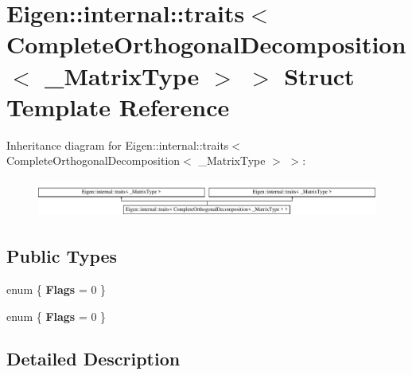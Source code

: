 \hypertarget{struct_eigen_1_1internal_1_1traits_3_01_complete_orthogonal_decomposition_3_01___matrix_type_01_4_01_4}{}\section{Eigen\+:\+:internal\+:\+:traits$<$ Complete\+Orthogonal\+Decomposition$<$ \+\_\+\+Matrix\+Type $>$ $>$ Struct Template Reference}
\label{struct_eigen_1_1internal_1_1traits_3_01_complete_orthogonal_decomposition_3_01___matrix_type_01_4_01_4}
Inheritance diagram for Eigen\+:\+:internal\+:\+:traits$<$ Complete\+Orthogonal\+Decomposition$<$ \+\_\+\+Matrix\+Type $>$ $>$\+:\begin{figure}[H]
\begin{center}
\leavevmode
\includegraphics[height=1.250000cm]{struct_eigen_1_1internal_1_1traits_3_01_complete_orthogonal_decomposition_3_01___matrix_type_01_4_01_4}
\end{center}
\end{figure}
\subsection*{Public Types}
\begin{DoxyCompactItemize}
\item 
\mbox{\label{struct_eigen_1_1internal_1_1traits_3_01_complete_orthogonal_decomposition_3_01___matrix_type_01_4_01_4_a56598debeaac349fc6dc4bf78e3febb3}} 
enum \{ {\bfseries Flags} = 0
 \}
\item 
\mbox{\label{struct_eigen_1_1internal_1_1traits_3_01_complete_orthogonal_decomposition_3_01___matrix_type_01_4_01_4_acc121865c7365b7e4dde9a68f527d282}} 
enum \{ {\bfseries Flags} = 0
 \}
\end{DoxyCompactItemize}


\subsection{Detailed Description}
